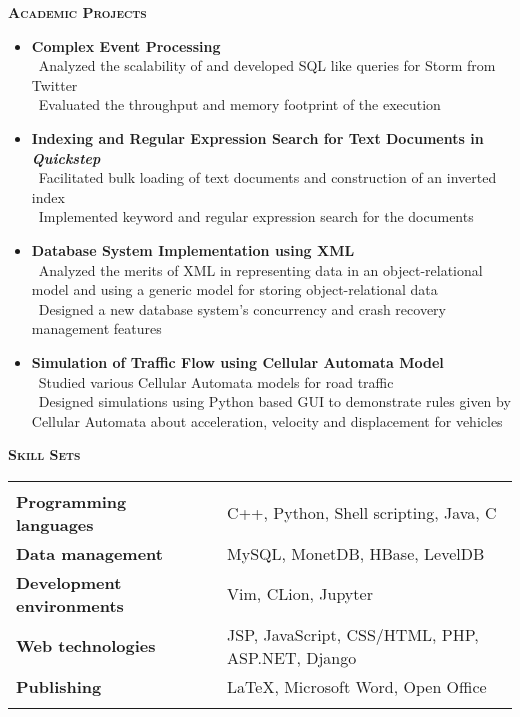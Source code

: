 \documentclass[11pt]{article}
\newcommand{\graybox}[1]{\begin{mdframed}[backgroundcolor=light-gray, linecolor=light-gray, roundcorner=10pt, shadow=false, shadowsize=1pt]
\Large{\textbf{\textsc{#1}}}
\end{mdframed}}
\begin{document}
\graybox{Academic Projects}
\begin{itemize}\addtolength{\itemsep}{-0.5\baselineskip}%
\item{\textbf{Complex Event Processing}}\\
	\textendash\ Analyzed the scalability of and developed SQL like queries for Storm from Twitter\\
	\textendash\ Evaluated the throughput and memory footprint of the execution\\
\item{\textbf{Indexing and Regular Expression Search for Text Documents in \textit{Quickstep}}}\\
	\textendash\ Facilitated bulk loading of text documents and construction of an inverted index\\
	\textendash\ Implemented keyword and regular expression search for the documents\\%
\item{\textbf{Database System Implementation using XML}}\\
	\textendash\ Analyzed the merits of XML in representing data in an object-relational model and using a generic model for storing object-relational data\\
	\textendash\ Designed a new database system's concurrency and crash recovery management features\\
	\item{\textbf{Simulation of Traffic Flow using Cellular Automata Model}}\\
	\textendash\ Studied various Cellular Automata models for road traffic\\
	\textendash\ Designed simulations using Python based GUI to demonstrate rules given by Cellular Automata about acceleration, velocity and displacement for vehicles\\
\end{itemize}
\graybox{Skill Sets}
\begin{tabular}{l  c  l}
 & \\
\textbf{Programming languages} & & \quad C++, Python, Shell scripting, Java, C\\
\textbf{Data management} & & \quad MySQL, MonetDB, HBase, LevelDB\\
\textbf{Development environments} & & \quad Vim, CLion, Jupyter\\
\textbf{Web technologies} & & \quad JSP, JavaScript, CSS/HTML, PHP, ASP.NET, Django\\
\textbf{Publishing} & & \quad \LaTeX, Microsoft Word, Open Office\\ \\
\end{tabular}
\end{document}
